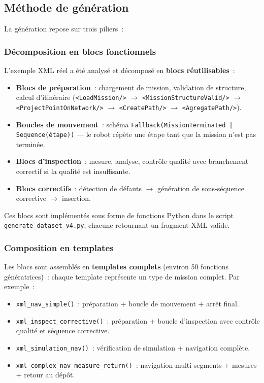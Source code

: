 \documentclass[a4paper,11pt]{article}
\newcommand{\file}[1]{\texttt{#1}}
\newcommand{\skill}[1]{\texttt{<#1/>}}
\begin{document}
\subsection{Méthode de génération}

La génération repose sur trois piliers~:

\subsubsection{Décomposition en blocs fonctionnels}

L'exemple XML réel a été analysé et décomposé en \textbf{blocs
réutilisables}~:

\begin{itemize}
    \item \textbf{Blocs de préparation}~: chargement de mission, validation
    de structure, calcul d'itinéraire (\skill{LoadMission} $\rightarrow$
    \skill{MissionStructureValid} $\rightarrow$
    \skill{ProjectPointOnNetwork} $\rightarrow$ \skill{CreatePath}
    $\rightarrow$ \skill{AgregatePath}).
    \item \textbf{Boucles de mouvement}~: schéma
    \texttt{Fallback(MissionTerminated | Sequence(étape))} --- le robot
    répète une étape tant que la mission n'est pas terminée.
    \item \textbf{Blocs d'inspection}~: mesure, analyse, contrôle qualité
    avec branchement correctif si la qualité est insuffisante.
    \item \textbf{Blocs correctifs}~: détection de défauts $\rightarrow$
    génération de sous-séquence corrective $\rightarrow$ insertion.
\end{itemize}

Ces blocs sont implémentés sous forme de fonctions Python dans le script
\file{generate\_dataset\_v4.py}, chacune retournant un fragment XML valide.

\subsubsection{Composition en templates}

Les blocs sont assemblés en \textbf{templates complets} (environ 50 fonctions
génératrices)~: chaque template représente un type de mission complet. Par
exemple~:

\begin{itemize}
    \item \texttt{xml\_nav\_simple()}~: préparation + boucle de mouvement +
    arrêt final.
    \item \texttt{xml\_inspect\_corrective()}~: préparation + boucle
    d'inspection avec contrôle qualité et séquence corrective.
    \item \texttt{xml\_simulation\_nav()}~: vérification de simulation +
    navigation complète.
    \item \texttt{xml\_complex\_nav\_measure\_return()}~: navigation
    multi-segments + mesures + retour au dépôt.
\end{itemize}
\end{document}
